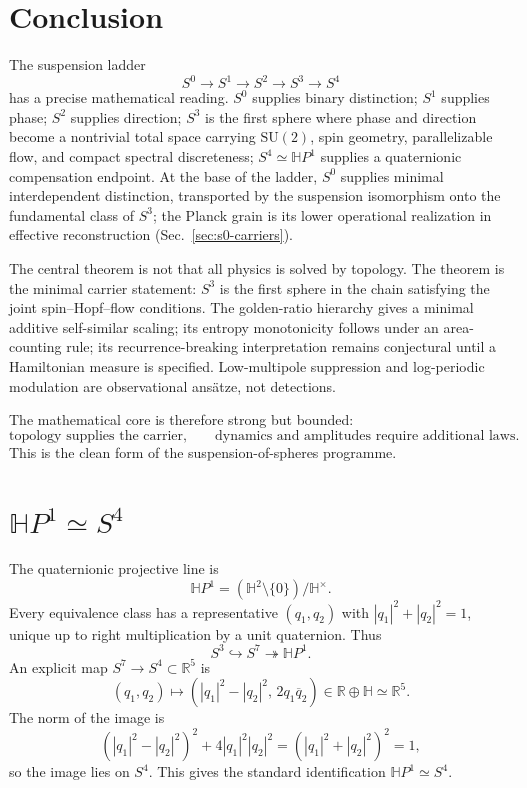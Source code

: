 \documentclass[11pt,a4paper]{article}
\theoremstyle{definition}
\theoremstyle{remark}
\newcommand{\Szero}{S^{0}}
\newcommand{\Sone}{S^{1}}
\newcommand{\Stwo}{S^{2}}
\newcommand{\Sthree}{S^{3}}
\newcommand{\Sfour}{S^{4}}
\newcommand{\Sseven}{S^{7}}
\newcommand{\HP}{\mathbb{H}P}
\newcommand{\R}{\mathbb{R}}
\newcommand{\Hbb}{\mathbb{H}}
\newcommand{\SU}{\mathrm{SU}}
\begin{document}
\section{Conclusion}

The suspension ladder
\[
\Szero\to\Sone\to\Stwo\to\Sthree\to\Sfour
\]
has a precise mathematical reading.  $\Szero$ supplies binary distinction; $\Sone$ supplies
phase; $\Stwo$ supplies direction; $\Sthree$ is the first sphere where phase and direction become
a nontrivial total space carrying $\SU(2)$, spin geometry, parallelizable flow, and compact
spectral discreteness; $\Sfour\simeq\HP^{1}$ supplies a quaternionic compensation endpoint.
At the base of the ladder, $\Szero$ supplies minimal interdependent distinction, transported by
the suspension isomorphism onto the fundamental class of $\Sthree$; the Planck grain is its
lower operational realization in effective reconstruction (Sec.~\ref{sec:s0-carriers}).

The central theorem is not that all physics is solved by topology.  The theorem is the minimal
carrier statement: $\Sthree$ is the first sphere in the chain satisfying the joint spin--Hopf--flow
conditions.  The golden-ratio hierarchy gives a minimal additive self-similar scaling; its entropy
monotonicity follows under an area-counting rule; its recurrence-breaking interpretation remains
conjectural until a Hamiltonian measure is specified.  Low-multipole suppression and
log-periodic modulation are observational ansätze, not detections.

The mathematical core is therefore strong but bounded:
\[
\text{topology supplies the carrier,}
\qquad
\text{dynamics and amplitudes require additional laws.}
\]
This is the clean form of the suspension-of-spheres programme.

\appendix

\section{\texorpdfstring{$\HP^{1}\simeq\Sfour$}{HP1 = S4}}

The quaternionic projective line is
\begin{equation}
\HP^{1}=(\Hbb^{2}\setminus\{0\})/\Hbb^{\times}.
\end{equation}
Every equivalence class has a representative $(q_{1},q_{2})$ with
$|q_{1}|^{2}+|q_{2}|^{2}=1$, unique up to right multiplication by a unit quaternion.
Thus
\[
\Sthree\hookrightarrow\Sseven\twoheadrightarrow\HP^{1}.
\]
An explicit map $\Sseven\to\Sfour\subset\R^{5}$ is
\begin{equation}
(q_{1},q_{2})\longmapsto
\left(
|q_{1}|^{2}-|q_{2}|^{2},\,
2q_{1}\overline{q}_{2}
\right)\in\R\oplus\Hbb\simeq\R^{5}.
\end{equation}
The norm of the image is
\[
(|q_{1}|^{2}-|q_{2}|^{2})^{2}+4|q_{1}|^{2}|q_{2}|^{2}
=(|q_{1}|^{2}+|q_{2}|^{2})^{2}=1,
\]
so the image lies on $\Sfour$.  This gives the standard identification
$\HP^{1}\simeq\Sfour$.
\end{document}
